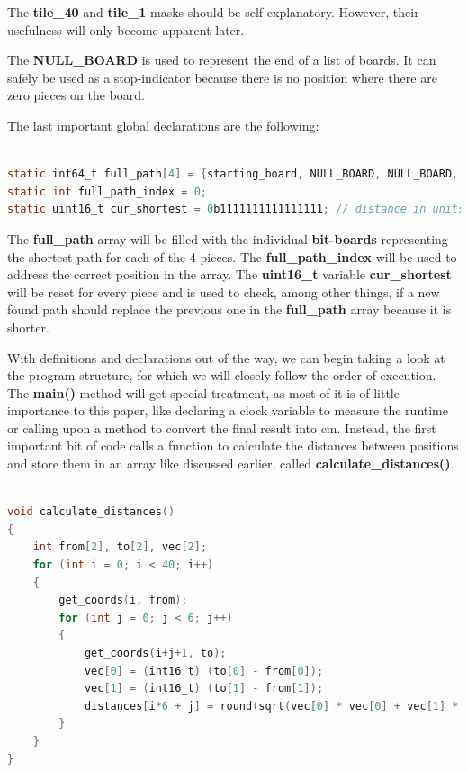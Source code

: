 \documentclass[12pt]{article}
\begin{document}
The \textbf{tile\_40} and \textbf{tile\_1} masks should be self explanatory. However, their usefulness will only become apparent later.

The \textbf{NULL\_BOARD} is used to represent the end of a list of boards. It can safely be used as a stop-indicator because there is no position where there are zero pieces on the board.


The last important global declarations are the following:

\begin{lstlisting}[language=C, caption={Global declarations}, label={lst:global-declarations}]

static int64_t full_path[4] = {starting_board, NULL_BOARD, NULL_BOARD, NULL_BOARD};
static int full_path_index = 0;
static uint16_t cur_shortest = 0b1111111111111111; // distance in units

\end{lstlisting}

The \textbf{full\_path} array will be filled with the individual \textbf{bit-boards} representing the shortest path for each of the 4 pieces. The \textbf{full\_path\_index} will be used to address the correct position in the array. The \textbf{uint16\_t} variable \textbf{cur\_shortest} will be reset for every piece and is used to check, among other things, if a new found path should replace the previous one in the \textbf{full\_path} array because it is shorter.

With definitions and declarations out of the way, we can begin taking a look at the program structure, for which we will closely follow the order of execution. The \textbf{main()} method will get special treatment, as most of it is of little importance to this paper, like declaring a clock variable to measure the runtime or calling upon a method to convert the final result into cm.
Instead, the first important bit of code calls a function to calculate the distances between positions and store them in an array like discussed earlier, called \textbf{calculate\_distances()}.

\begin{lstlisting}[language=C, caption={Distance calculation}, label={lst:distance calculation}]

void calculate_distances()
{
    int from[2], to[2], vec[2];
    for (int i = 0; i < 40; i++)
    {
        get_coords(i, from);
        for (int j = 0; j < 6; j++)
        {
            get_coords(i+j+1, to);
            vec[0] = (int16_t) (to[0] - from[0]);
            vec[1] = (int16_t) (to[1] - from[1]);
            distances[i*6 + j] = round(sqrt(vec[0] * vec[0] + vec[1] * vec[1]));
        }
    }
}
\end{lstlisting}
\end{document}
